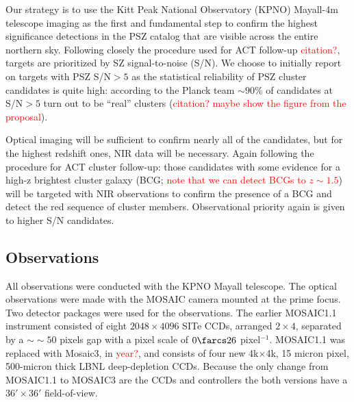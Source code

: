 \documentclass[apj, revtex4]{emulateapj}
\newcommand{\editorial}[1]{\textcolor{red}{#1}}
\begin{document}
Our strategy is to use the Kitt Peak National Observatory (KPNO) Mayall-4m telescope imaging as the first and fundamental step to confirm the highest significance detections in the PSZ catalog that are visible across the entire northern sky. Following closely the procedure used for ACT follow-up \editorial{citation?}, targets are prioritized by SZ signal-to-noise (S/N). We choose to initially report on targets with PSZ S/N$>5$ as the statistical reliability of PSZ cluster candidates is quite high: according to the Planck team $\sim90$\% of candidates at S/N$>5$ turn out to be ``real'' clusters (\editorial{citation? maybe show the figure from the proposal}).


Optical imaging will be sufficient to confirm nearly all of the candidates, but for the highest redshift ones, NIR data will be necessary. Again following the procedure for ACT cluster follow-up: those candidates with some evidence for a high-z brightest cluster galaxy (BCG; \editorial{note that we can detect BCGs to $z \sim 1.5$}) will be targeted with NIR observations to confirm the presence of a BCG and detect the red sequence of cluster members. Observational priority again is given to higher S/N candidates. 

\subsection{Observations}\label{sec: observations}
All observations were conducted with the KPNO Mayall telescope. The optical observations were made with the MOSAIC camera mounted at the prime focus. Two detector packages were used for the observations. The earlier MOSAIC1.1 instrument consisted of eight $2048\times4096$ SITe CCDs, arranged $2\times4$, separated by a $∼\sim50$ pixels gap with a pixel scale of $0\farcs26$ pixel$^{-1}$. MOSAIC1.1 was replaced with Mosaic3, in \editorial{year?},  and consists of four new 4k$\times$4k, 15 micron pixel, 500-micron thick LBNL deep-depletion CCDs. Because the only change from MOSAIC1.1 to MOSAIC3 are the CCDs and controllers the both versions have a $36' \times 36'$ field-of-view.
\end{document}
